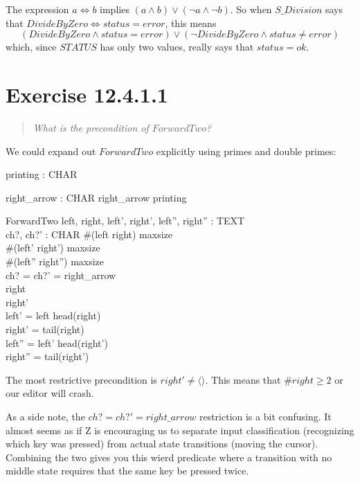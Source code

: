 \documentclass[10pt]{article}
\begin{document}
The expression $a \iff b$ implies $(a \land b) \lor (\lnot a \land \lnot b)$.  So when $S\_Division$
says that $DivideByZero \iff status = error$, this means 
\[ (DivideByZero \land status = error) \lor
   (\lnot DivideByZero \land status \neq error) \]
which, since $STATUS$ has only two values, really says that $status = ok$.
\tocheck


\section{Exercise 12.4.1.1}
\begin{quote}
  {\it
   What is the precondition of $ForwardTwo$? 
  }
\end{quote}

We could expand out $ForwardTwo$ explicitly using primes and double primes:

\begin{spec}
  \begin{axdef}
    printing : \power CHAR
  \end{axdef}
  \begin{axdef}
    right\_arrow : CHAR
    \where
    right\_arrow \notin printing
  \end{axdef}
  \begin{schema}{ForwardTwo}
    left, right, left', right', left'', right'' : TEXT \\
    ch?, ch?' : CHAR \where
    \#(left \cat right) \leq maxsize\\
    \#(left' \cat right') \leq maxsize\\
    \#(left'' \cat right'') \leq maxsize\\
    ch? = ch?' = right\_arrow \\
    right \neq \langle \rangle \\
    right' \neq \langle \rangle \\
    left' = left \cat \langle head(right)\rangle \\
    right' = tail(right) \\
    left'' = left' \cat \langle head(right')\rangle \\
    right'' = tail(right') \\
  \end{schema}
\end{spec}
The most restrictive precondition is $right' \neq \langle \rangle$.  This means that $\#right \geq
2$ or our editor will crash.

As a side note, the $ch? = ch?' = right\_arrow$ restriction is a bit confusing.  It almost seems as
if Z is encouraging us to separate input classification (recognizing which key was pressed) from
actual state transitions (moving the cursor).  Combining the two gives you this wierd predicate where
a transition with no middle state requires that the same key be pressed twice.
\end{document}
